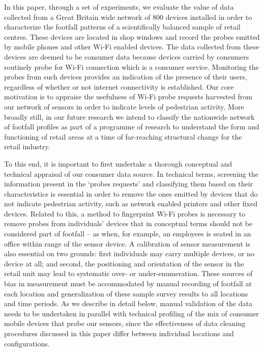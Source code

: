 In this paper, through a set of experiments, we evaluate the value of data
collected from a Great Britain wide network of 800 devices \citep{sss2016}
installed in order to characterize the footfall patterns of a scientifically
balanced sample of retail centres.  These devices are located in shop windows
and record the probes emitted by mobile phones and other Wi-Fi enabled devices.
The data collected from these devices are deemed to be consumer data because
devices carried by consumers routinely probe for Wi-Fi connection which is a
consumer service.  Monitoring the probes from such devices provides an
indication of the presence of their users, regardless of whether or not internet
connectivity is established.  Our core motivation is to appraise the usefulness
of Wi-Fi probe requests harvested from our network of sensors in order to
indicate levels of pedestrian activity.  More broadly still, in our future
research we intend to classify the nationwide network of footfall profiles as
part of a programme of research to understand the form and functioning of retail
areas at a time of far-reaching structural change for the retail industry.

To this end, it is important to first undertake a thorough conceptual and
technical appraisal of our consumer data source.  In technical terms, screening
the information present in the `probes requests' and classifying them based on
their characteristics is essential in order to remove the ones emitted by
devices that do not indicate pedestrian activity, such as network enabled
printers and other fixed devices.  Related to this, a method to fingerprint
Wi-Fi probes is necessary to remove probes from individuals’ devices that in
conceptual terms should not be considered part of footfall – as when, for
example, an employees is seated in an office within range of the sensor device.
A calibration of sensor measurement is also essential on two grounds: first
individuals may carry multiple devices, or no device at all; and second, the
positioning and orientation of the sensor in the retail unit may lead to
systematic over- or under-enumeration.  These sources of bias in measurement
must be accommodated by manual recording of footfall at each location and
generalization of these sample survey results to all locations and time periods.
As we describe in detail below, manual validation of the data needs to be
undertaken in parallel with technical profiling of the mix of consumer mobile
devices that probe our sensors, since the effectiveness of data cleaning
procedures discussed in this paper differ between individual locations and
configurations.
